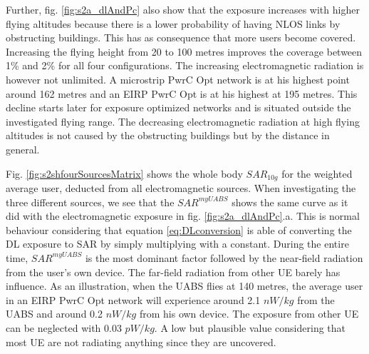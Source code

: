 \documentclass[twocolumn]{phdsymp} %
\begin{document}
Further, fig. \ref{fig:s2a_dlAndPc} also show that the exposure increases with higher flying altitudes
because there is a lower probability of having \gls{NLOS} links by obstructing buildings. This has as consequence that  
more users become covered. 
Increasing the flying height from 20 to 100 metres improves the coverage between 1\% and 2\% for all four configurations.
The increasing electromagnetic radiation is however not unlimited.
A microstrip \gls{PwrC Opt} network is at his highest point  
around 162 metres and an \gls{EIRP} \gls{PwrC Opt} is at his highest at 195 metres.
This decline starts later for exposure optimized networks and is situated outside the investigated flying range.
The decreasing electromagnetic radiation at high flying altitudes is not caused by the obstructing buildings but by the 
distance in general.

Fig. \ref{fig:s2shfourSourcesMatrix} shows the whole body $SAR_{10g}$ for the weighted average user, deducted from all electromagnetic sources. 
When investigating the three different sources, we see 
that the $SAR^{myUABS}$ shows the same curve as it did with the electromagnetic exposure 
in fig. \ref{fig:s2a_dlAndPc}.a. This is normal behaviour considering that equation \ref{eq:DLconversion} is able of 
converting the \gls{DL} exposure to \gls{SAR} by simply multiplying with a constant.
During the entire time, $SAR^{myUABS}$ is the most dominant factor followed by 
 the near-field radiation from the user's own device.
The far-field radiation from other \gls{UE} barely has influence. 
As an illustration, when the \gls{UABS} flies at 140 metres, the average user in an \gls{EIRP} \gls{PwrC Opt} network will 
experience around  2.1 $nW/kg$ from the \gls{UABS} and around 0.2 $nW/kg$ from his own device.
The exposure from other \gls{UE} can be neglected with 0.03 $pW/kg$. A low but plausible value considering that most 
\gls{UE} are not radiating anything since they are uncovered.
\end{document}
